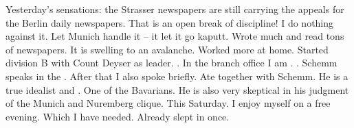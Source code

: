Yesterday's sensations: the Strasser newspapers are still carrying the appeals for the Berlin daily newspapers. That is an open break of discipline! I do nothing against it. Let Munich handle it -- it let it go kaputt. Wrote much and read tons of newspapers. It is swelling to an avalanche. Worked more at home. Started  division B with Count Deyser as leader. . In the branch office I am . . Schemm speaks in the . After that I also spoke briefly. Ate together with Schemm. He is a true idealist and . One of the  Bavarians. He is also very skeptical in his judgment of the Munich and Nuremberg clique. This Saturday. I enjoy myself on a free evening. Which I have needed. Already slept in once.